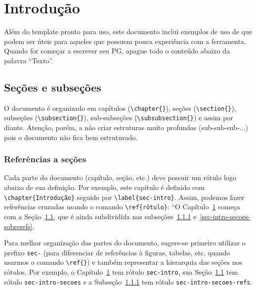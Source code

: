 \chapter{Introdução}
\label{sec-intro}

Além do template pronto para uso, este documento inclui exemplos de uso de \latex que podem ser úteis para aqueles que possuem pouca experiência com a ferramenta. Quando for começar a escrever seu PG, apague todo o conteúdo abaixo da palavra ``Texto''.



\section{Seções e subseções}
\label{sec-intro-secoes}

O documento é organizado em capítulos (\texttt{\textbackslash chapter\{\}}), seções (\texttt{\textbackslash section\{\}}), subseções (\texttt{\textbackslash subsection\{\}}), sub-subseções (\texttt{\textbackslash subsubsection\{\}}) e assim por diante. Atenção, porém, a não criar estruturas muito profundas (sub-sub-sub-...) pois o documento não fica bem estruturado.


\subsection{Referências a seções}
\label{sec-intro-secoes-refs}

Cada parte do documento (capítulo, seção, etc.) deve possuir um rótulo logo abaixo de sua definição. Por exemplo, este capítulo é definido com \texttt{\textbackslash chapter\{Introdução\}} seguido por \texttt{\textbackslash label\{sec-intro\}}. Assim, podemos fazer referências cruzadas usando o comando \texttt{\textbackslash ref\{rótulo\}}: ``O Capítulo~\ref{sec-intro} começa com a Seção~\ref{sec-intro-secoes}, que é ainda subdividida nas subseções~\ref{sec-intro-secoes-refs} e~\ref{sec-intro-secoes-sobrerefs}.

Para melhor organização das partes do documento, sugere-se primeiro utilizar o prefixo \texttt{sec-} (para diferenciar de referências à figuras, tabelas, etc. quando usarmos o comando \texttt{\textbackslash ref\{\}}) e também representar a hierarquia das seções nos rótulos. Por exemplo, o Capítulo~\ref{sec-intro} tem rótulo \texttt{sec-intro}, sua Seção~\ref{sec-intro-secoes} tem rótulo \texttt{sec-intro-secoes} e a Subseção~\ref{sec-intro-secoes-refs} tem rótulo \texttt{sec-intro-secoes-refs}.



